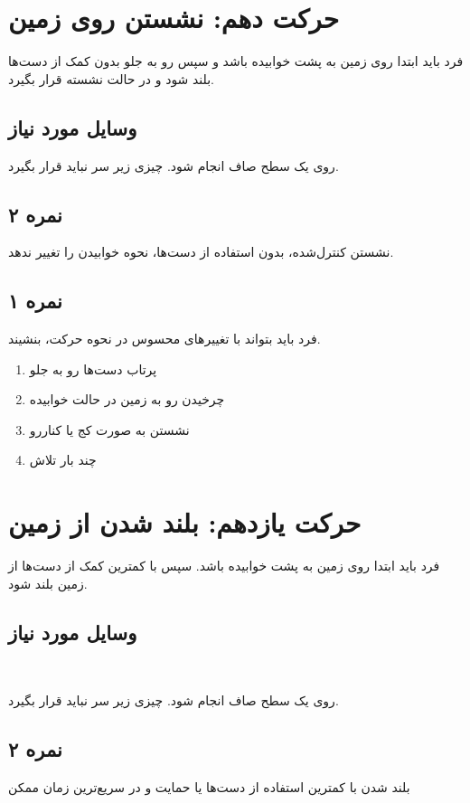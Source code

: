 \documentclass[12pt]{report}
\begin{document}
	\section*{حرکت دهم: نشستن روی زمین}
	فرد باید ابتدا روی زمین به پشت خوابیده باشد و سپس رو به جلو بدون کمک از دست‌ها بلند شود و در حالت نشسته قرار بگیرد.
	\subsection*{وسایل مورد نیاز}
	روی یک سطح صاف انجام شود. چیزی زیر سر نباید قرار بگیرد.
	\subsection*{نمره ۲}
	نشستن کنترل‌شده، بدون استفاده از دست‌ها، نحوه خوابیدن را تغییر ندهد.
	\subsection*{نمره ۱}
	فرد باید بتواند با تغییر‌های محسوس در نحوه حرکت، بنشیند.
	\begin{enumerate}
		\item پرتاب دست‌ها رو به جلو
		\item چرخیدن رو به زمین در حالت خوابیده
		\item نشستن به صورت کج یا کنار‌رو
		\item چند بار تلاش
	\end{enumerate}
	\newpage
	
	\section*{حرکت یازدهم: بلند شدن از زمین}
فرد باید ابتدا روی زمین به پشت خوابیده باشد. سپس با کمترین کمک از دست‌ها از زمین بلند شود.
	‍\subsection*{وسایل مورد نیاز}
	‍‍‍‍
	روی یک سطح صاف انجام شود. چیزی زیر سر نباید قرار بگیرد.
	\subsection*{نمره ۲}
	بلند شدن با کمترین استفاده از دست‌ها یا حمایت و در سریع‌ترین زمان ممکن
\end{document}
